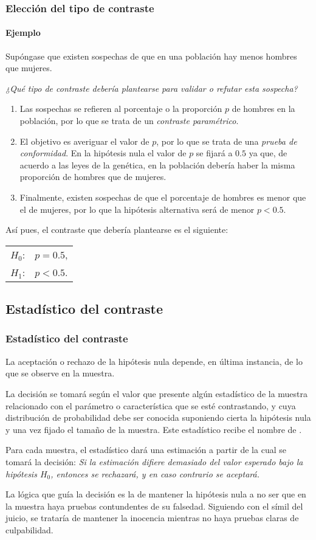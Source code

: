 \begin{frame}
\frametitle{Elección del tipo de contraste}
\framesubtitle{Ejemplo}
Supóngase que existen sospechas de que en una población hay menos hombres que mujeres.

\emph{¿Qué tipo de contraste debería plantearse para validar o refutar esta sospecha?}
\pause
\begin{enumerate}[<+->]
\item Las sospechas se refieren al porcentaje o la proporción $p$ de hombres en la población, por lo que se trata de un \emph{contraste paramétrico}.
\item El objetivo es averiguar el valor de $p$, por lo que se trata de una \emph{prueba de conformidad}.
En la hipótesis nula el valor de $p$ se fijará a $0.5$ ya que, de acuerdo a las leyes de la genética, en la población debería
haber la misma proporción de hombres que de mujeres.
\item Finalmente, existen sospechas de que el porcentaje de hombres es menor que el de mujeres, por lo que la
hipótesis alternativa será de menor $p<0.5$.
\end{enumerate}
\pause
Así pues, el contraste que debería plantearse es el siguiente:
\begin{center}
\begin{tabular}{ll}
$H_0$: & $p=0.5$,\\
$H_1$: & $p<0.5$.
\end{tabular}
\end{center}
\end{frame}


\subsection{Estadístico del contraste}
\begin{frame}
\frametitle{Estadístico del contraste}
La aceptación o rechazo de la hipótesis nula depende, en última instancia, de lo que se observe en la muestra.

La decisión se tomará según el valor que presente algún estadístico de la muestra relacionado con el parámetro o característica que se esté contrastando, y cuya distribución de probabilidad debe ser conocida suponiendo cierta la hipótesis nula y una vez fijado el tamaño de la muestra.
Este estadístico recibe el nombre de .

Para cada muestra, el estadístico dará una estimación a partir de la cual se tomará la decisión:
\alert{\emph{Si la estimación difiere demasiado del valor esperado bajo la hipótesis $H_0$, entonces se rechazará, y en caso contrario se aceptará.}}

La lógica que guía la decisión es la de mantener la hipótesis nula a no ser que en la muestra haya pruebas contundentes de su falsedad. Siguiendo con el símil del juicio, se trataría de mantener la inocencia mientras no haya pruebas claras de culpabilidad.
\end{frame}


